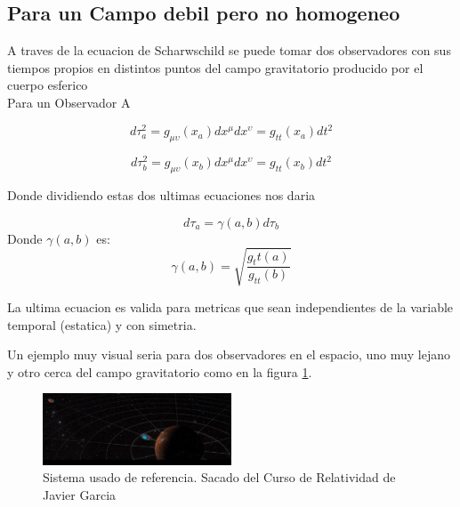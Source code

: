 \documentclass[12pt,twoside]{rif}
\begin{document}
	\subsection{Para un Campo debil pero no homogeneo}
A traves de la ecuacion de Scharwschild se puede tomar dos observadores con sus tiempos propios en distintos puntos del campo gravitatorio producido por el cuerpo esferico\\
Para un Observador A

\begin{equation}
d\tau_{a}^{2}=g_{\mu\upsilon}(x_{a})dx^{\mu}dx^{\upsilon}=g_{tt}(x_{a})dt^{2}
\end{equation}

\begin{equation}
d\tau_{b}^{2}=g_{\mu\upsilon}(x_{b})dx^{\mu}dx^{\upsilon}=g_{tt}(x_{b})dt^{2}
\end{equation}

Donde dividiendo estas dos ultimas ecuaciones nos daria 

\begin{equation}
d\tau_{a} =\gamma(a,b) d\tau_{b}
\end{equation}		
Donde $\gamma(a,b)$ es: \\

\begin{equation}
\gamma(a,b)=\sqrt{\frac{g_tt(a)}{g_{tt}(b)}}
\end{equation}

La ultima ecuacion es valida para metricas que sean independientes de la variable temporal (estatica) y con simetria.	\\

\clearpage %

Un ejemplo muy visual seria para dos observadores en el espacio, uno muy lejano y otro cerca del campo gravitatorio como en la figura \ref{fig:sist}.
	
	\begin{figure}[h]
	\centering
	\includegraphics[width=0.5\textwidth]{img/sistema.png}
	\caption{Sistema usado de referencia. Sacado del Curso de Relatividad de Javier 		Garcia}
	\label{fig:sist}
	\end{figure}
\end{document}

